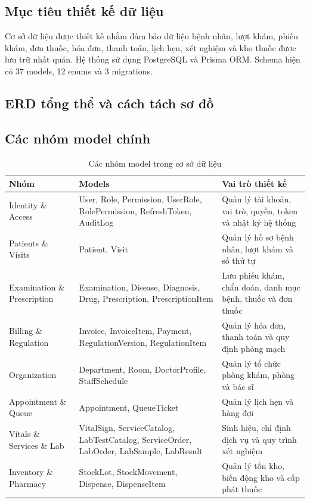 \subsection{Mục tiêu thiết kế dữ liệu}

Cơ sở dữ liệu được thiết kế nhằm đảm bảo dữ liệu bệnh nhân, lượt khám, phiếu khám, đơn thuốc, hóa đơn, thanh toán, lịch hẹn, xét nghiệm và kho thuốc được lưu trữ nhất quán. Hệ thống sử dụng PostgreSQL và Prisma ORM. Schema hiện có 37 models, 12 enums và 3 migrations.
\subsection{ERD tổng thể và cách tách sơ đồ}

\subsection{Các nhóm model chính}

\begin{longtable}{|p{3.3cm}|p{5.5cm}|p{5.4cm}|}
\caption{Các nhóm model trong cơ sở dữ liệu}\\
\hline
\textbf{Nhóm} & \textbf{Models} & \textbf{Vai trò thiết kế} \\
\hline
Identity \& Access & User, Role, Permission, UserRole, RolePermission, RefreshToken, AuditLog & Quản lý tài khoản, vai trò, quyền, token và nhật ký hệ thống \\
\hline
Patients \& Visits & Patient, Visit & Quản lý hồ sơ bệnh nhân, lượt khám và số thứ tự \\
\hline
Examination \& Prescription & Examination, Disease, Diagnosis, Drug, Prescription, PrescriptionItem & Lưu phiếu khám, chẩn đoán, danh mục bệnh, thuốc và đơn thuốc \\
\hline
Billing \& Regulation & Invoice, InvoiceItem, Payment, RegulationVersion, RegulationItem & Quản lý hóa đơn, thanh toán và quy định phòng mạch \\
\hline
Organization & Department, Room, DoctorProfile, StaffSchedule & Quản lý tổ chức phòng khám, phòng và bác sĩ \\
\hline
Appointment \& Queue & Appointment, QueueTicket & Quản lý lịch hẹn và hàng đợi \\
\hline
Vitals \& Services \& Lab & VitalSign, ServiceCatalog, LabTestCatalog, ServiceOrder, LabOrder, LabSample, LabResult & Sinh hiệu, chỉ định dịch vụ và quy trình xét nghiệm \\
\hline
Inventory \& Pharmacy & StockLot, StockMovement, Dispense, DispenseItem & Quản lý tồn kho, biến động kho và cấp phát thuốc \\
\hline
\end{longtable}

